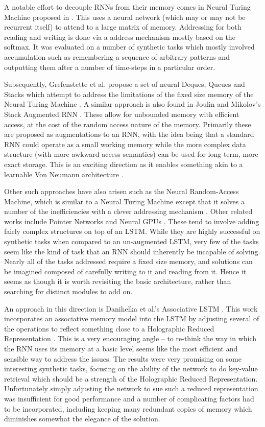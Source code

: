 A notable effort to decouple RNNs from their memory comes in Neural Turing Machine proposed in
\autocite{Graves2014}. This uses a neural network (which may or may not be recurrent itself) to
attend to a large matrix of memory. Addressing for both reading and writing is done via a
address mechanism mostly based on the softmax. It was evaluated on a number of synthetic tasks
which mostly involved accumulation such as remembering a sequence of arbitrary patterns and outputting
them after a number of time-steps in a particular order.

Subsequently, Grefenstette et al. propose a set of neural Deques, Queues and Stacks which attempt to
address the limitations of the fixed size memory of the Neural Turing Machine 
\autocite{Grefenstette2015}. A similar approach is also found in Joulin and Mikolov's Stack Augmented
RNN \autocite{Joulin2015}. These allow for unbounded memory with efficient access, at the cost of
the random access nature of the memory. Primarily these are proposed as augmentations to an RNN,
with the idea being that a standard RNN could operate as a small working memory while the more
complex data structure (with more awkward access semantics) can be used for long-term, more exact
storage. This is an exciting direction as it enables something akin to a learnable Von Neumann
architecture \autocite{Graves2014}.

Other such approaches have also arisen such as the Neural Random-Access Machine, which is similar to
a Neural Turing Machine except that it solves a number of the inefficiencies with a clever addressing
mechanism \autocite{Kurach2016}. Other related works include Pointer Networks \autocite{Vinyals2015}
and Neural GPUs \autocite{Kaiser2015}. These tend to involve adding fairly complex structures on
top of an LSTM. While they are highly successful on synthetic tasks when compared to an
un-augmented LSTM, very few of the tasks seem like the kind of task that an RNN should inherently be
incapable of solving. Nearly all of the tasks addressed require a fixed size memory, and solutions
can be imagined composed of carefully writing to it and reading from it. Hence it seems as though it
is worth revisiting the basic architecture, rather than searching for distinct modules to add on.

An approach in this direction is Danihelka et al.'s Associative LSTM \autocite{Danihelka2016}. 
This work incorporates an associative memory model into the LSTM by adjusting several of the
operations to reflect something close to a Holographic Reduced Representation \autocite{Plate1995}.
This is a very encouraging angle -- to re-think the way in which the RNN uses its memory at a basic
level seems like the most efficient and sensible way to address the issues. The results were
very promising on some interesting synthetic tasks, focusing on the ability of the network to do
key-value retrieval which should be a strength of the Holographic Reduced Representation.
Unfortunately simply adjusting the network to sue such a reduced representation was insufficient for
good performance and a number of complicating factors had to be incorporated, including keeping many
redundant copies of memory which diminishes somewhat the elegance of the solution.


